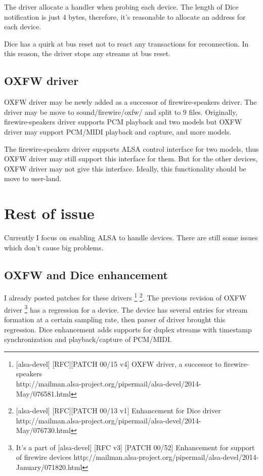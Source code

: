 \documentclass[onecolumn]{article}
\begin{document}
The driver allocate a handler when probing each device. The length of Dice notification is just 4 bytes, therefore, it's reasonable to allocate an address for each device.

Dice has a quirk at bus reset not to react any transactions for reconnection. In this reason, the driver stops any streams at bus reset.


\subsection{OXFW driver}

OXFW driver may be newly added as a successor of firewire-speakers driver. The driver may be move to sound/firewire/oxfw/ and split to 9 files. Originally, firewire-speakers driver supports PCM playback and two models but OXFW driver may support PCM/MIDI playback and capture, and more models.

The firewire-speakers driver supports ALSA control interface for two models, thus OXFW driver may still support this interface for them. But for the other devices, OXFW driver may not give this interface. Ideally, this functionality should be move to user-land.


\section{Rest of issue}

Currently I focus on enabling ALSA to handle devices. There are still some issues which don't cause big problems.

\subsection{OXFW and Dice enhancement}

I already posted patches for these drivers \footnote{[alsa-devel] [RFC][PATCH 00/15 v4] OXFW driver, a successor to firewire-speakers \\ http://mailman.alsa-project.org/pipermail/alsa-devel/2014-May/076581.html} \footnote{[alsa-devel] [RFC][PATCH 00/13 v1] Enhancement for Dice driver \\ http://mailman.alsa-project.org/pipermail/alsa-devel/2014-May/076730.html}. The previous revision of OXFW driver \footnote{It's a part of [alsa-devel] [RFC v3] [PATCH 00/52] Enhancement for support of firewire devices http://mailman.alsa-project.org/pipermail/alsa-devel/2014-January/071820.html} has a regression for a device. The device has several entries for stream formation at a certain sampling rate, then parser of driver brought this regression. Dice enhancement adds supports for duplex streams with timestamp synchronization and playback/capture of PCM/MIDI.
\end{document}
